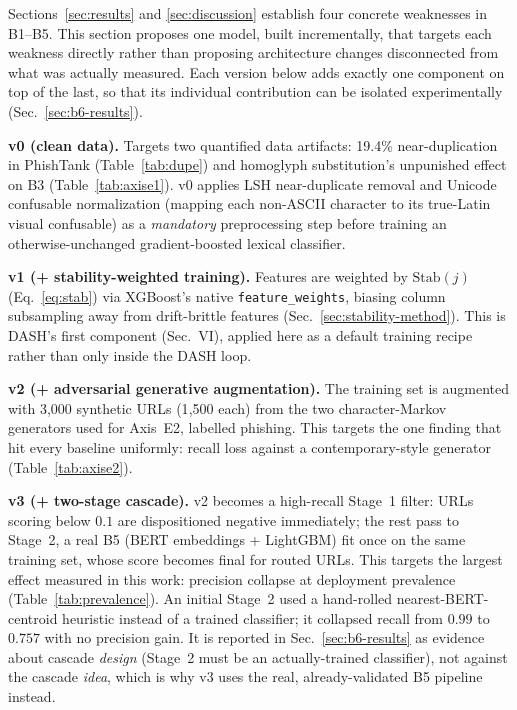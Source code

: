 \documentclass[conference]{IEEEtran}
\begin{document}
Sections~\ref{sec:results} and \ref{sec:discussion} establish four concrete
weaknesses in B1--B5. This section proposes one model, built incrementally,
that targets each weakness directly rather than proposing architecture
changes disconnected from what was actually measured. Each version below
adds exactly one component on top of the last, so that its individual
contribution can be isolated experimentally (Sec.~\ref{sec:b6-results}).

\smallskip\noindent\textbf{v0 (clean data).} Targets two quantified
data artifacts: 19.4\% near-duplication in PhishTank
(Table~\ref{tab:dupe}) and homoglyph substitution's unpunished effect on
B3 (Table~\ref{tab:axise1}). v0 applies LSH near-duplicate removal and
Unicode confusable normalization (mapping each non-ASCII character to its
true-Latin visual confusable) as a \emph{mandatory} preprocessing step
before training an otherwise-unchanged gradient-boosted lexical
classifier.

\smallskip\noindent\textbf{v1 (+ stability-weighted training).}
Features are weighted by $\mathrm{Stab}(j)$ (Eq.~\eqref{eq:stab}) via
XGBoost's native \texttt{feature\_weights}, biasing column subsampling
away from drift-brittle features (Sec.~\ref{sec:stability-method}). This
is DASH's first component (Sec.~VI), applied here as a default training
recipe rather than only inside the DASH loop.

\smallskip\noindent\textbf{v2 (+ adversarial generative augmentation).}
The training set is augmented with 3{,}000 synthetic URLs (1{,}500 each)
from the two character-Markov generators used for Axis~E2, labelled phishing. This targets the one finding that hit
every baseline uniformly:
recall loss against a contemporary-style generator
(Table~\ref{tab:axise2}).

\smallskip\noindent\textbf{v3 (+ two-stage cascade).} v2 becomes a
high-recall Stage~1 filter: URLs scoring below $0.1$ are dispositioned
negative immediately; the rest pass to Stage~2, a real B5 (BERT
embeddings + LightGBM) fit once on the same training set, whose score
becomes final for routed URLs. This targets the largest effect measured
in this work: precision collapse at deployment prevalence
(Table~\ref{tab:prevalence}). An initial Stage~2 used a hand-rolled
nearest-BERT-centroid heuristic instead of a trained classifier; it
collapsed recall from $0.99$ to $0.757$ with no precision gain. It is
reported in Sec.~\ref{sec:b6-results} as evidence about cascade
\emph{design} (Stage~2 must be an actually-trained classifier), not
against the cascade \emph{idea}, which is why v3 uses the real,
already-validated B5 pipeline instead.
\smallskip
\end{document}
